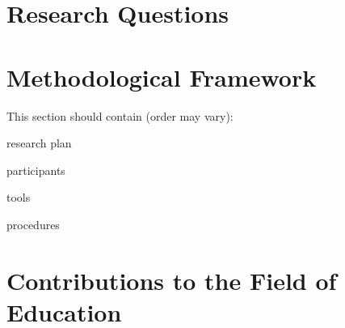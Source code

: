 \documentclass[
doc, 
biblatex,
12pt
]{apa6}
\begin{document}
\lipsum[2] %

\section{Research Questions}

\lipsum[3] %

\section{Methodological Framework}
This section should contain (order may vary):
\begin{APAitemize}
\item research plan
\item participants
\item tools
\item procedures
\end{APAitemize}


\section{Contributions to the Field of Education}
\lipsum[4] %

\printbibliography[title=References]
\end{document}

